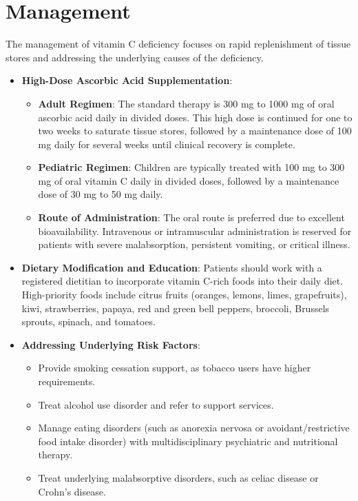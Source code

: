 \section*{Management}
The management of vitamin C deficiency focuses on rapid replenishment of tissue stores and addressing the underlying causes of the deficiency.

\begin{itemize}
    \item \textbf{High-Dose Ascorbic Acid Supplementation}:
        \begin{itemize}
            \item \textbf{Adult Regimen}: The standard therapy is 300 mg to 1000 mg of oral ascorbic acid daily in divided doses. This high dose is continued for one to two weeks to saturate tissue stores, followed by a maintenance dose of 100 mg daily for several weeks until clinical recovery is complete.
            \item \textbf{Pediatric Regimen}: Children are typically treated with 100 mg to 300 mg of oral vitamin C daily in divided doses, followed by a maintenance dose of 30 mg to 50 mg daily.
            \item \textbf{Route of Administration}: The oral route is preferred due to excellent bioavailability. Intravenous or intramuscular administration is reserved for patients with severe malabsorption, persistent vomiting, or critical illness.
        \end{itemize}
    \item \textbf{Dietary Modification and Education}: Patients should work with a registered dietitian to incorporate vitamin C-rich foods into their daily diet. High-priority foods include citrus fruits (oranges, lemons, limes, grapefruits), kiwi, strawberries, papaya, red and green bell peppers, broccoli, Brussels sprouts, spinach, and tomatoes.
    \item \textbf{Addressing Underlying Risk Factors}:
        \begin{itemize}
            \item Provide smoking cessation support, as tobacco users have higher requirements.
            \item Treat alcohol use disorder and refer to support services.
            \item Manage eating disorders (such as anorexia nervosa or avoidant/restrictive food intake disorder) with multidisciplinary psychiatric and nutritional therapy.
            \item Treat underlying malabsorptive disorders, such as celiac disease or Crohn's disease.

\end{itemize}
\end{itemize}
